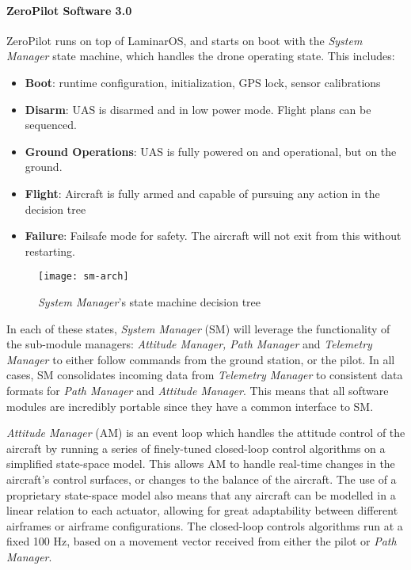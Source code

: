 \paragraph{ZeroPilot Software 3.0}

ZeroPilot runs on top of LaminarOS, and starts on boot with the \textit{System
Manager} state machine, which handles the drone operating state. This includes:

\begin{itemize}
    \item \textbf{Boot}: runtime configuration, initialization, GPS lock, sensor 
    calibrations

	\item \textbf{Disarm}: UAS is disarmed and in low power mode. Flight plans
		can be sequenced.

	\item \textbf{Ground Operations}: UAS is fully powered on and operational,
		but on the ground.

	\item \textbf{Flight}: Aircraft is fully armed and capable of pursuing any
		action in the decision tree

	\item \textbf{Failure}: Failsafe mode for safety. The aircraft will not
		exit from this without restarting.
\end{itemize}


\begin{figure}[H]
        \centering
        \texttt{[image: sm-arch]}
        \caption{\textit{System Manager}'s state machine decision tree}
\end{figure}

In each of these states, \textit{System Manager} (SM) will leverage the
functionality of the sub-module managers: \textit{Attitude Manager, Path
Manager} and \textit{Telemetry Manager} to either follow commands from the
ground station, or the pilot. In all cases, SM consolidates incoming data from
\textit{Telemetry Manager} to consistent data formats for \textit{Path Manager}
and \textit{Attitude Manager}. This means that all software modules are
incredibly portable since they have a common interface to SM.

\textit{Attitude Manager} (AM) is an event loop which handles the attitude
control of the aircraft by running a series of finely-tuned closed-loop control
algorithms on a simplified state-space model. This allows AM to handle
real-time changes in the aircraft's control surfaces, or changes to the balance
of the aircraft. The use of a proprietary state-space model also means that any
aircraft can be modelled in a linear relation to each actuator, allowing for
great adaptability between different airframes or airframe configurations. The
closed-loop controls algorithms run at a fixed 100 Hz, based on a movement
vector received from either the pilot or \textit{Path Manager}.

